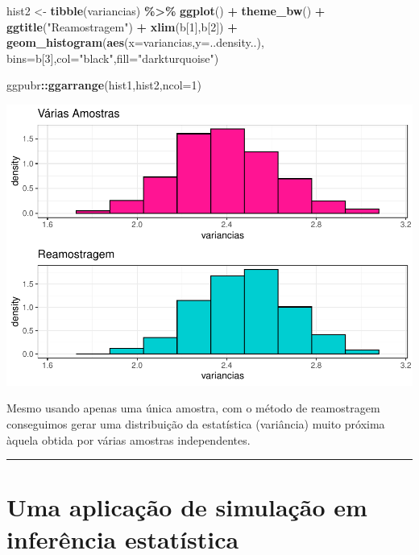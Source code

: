\documentclass[
]{book}
\newenvironment{Shaded}{\begin{snugshade}}{\end{snugshade}}
\newcommand{\AttributeTok}[1]{\textcolor[rgb]{0.13,0.29,0.53}{#1}}
\newcommand{\DecValTok}[1]{\textcolor[rgb]{0.00,0.00,0.81}{#1}}
\newcommand{\FunctionTok}[1]{\textcolor[rgb]{0.13,0.29,0.53}{\textbf{#1}}}
\newcommand{\NormalTok}[1]{#1}
\newcommand{\OtherTok}[1]{\textcolor[rgb]{0.56,0.35,0.01}{#1}}
\newcommand{\SpecialCharTok}[1]{\textcolor[rgb]{0.81,0.36,0.00}{\textbf{#1}}}
\newcommand{\StringTok}[1]{\textcolor[rgb]{0.31,0.60,0.02}{#1}}
\begin{document}
\begin{Shaded}
\begin{Highlighting}[]
\NormalTok{hist2 }\OtherTok{\textless{}{-}} \FunctionTok{tibble}\NormalTok{(variancias) }\SpecialCharTok{\%\textgreater{}\%} \FunctionTok{ggplot}\NormalTok{() }\SpecialCharTok{+} \FunctionTok{theme\_bw}\NormalTok{() }\SpecialCharTok{+} 
  \FunctionTok{ggtitle}\NormalTok{(}\StringTok{"Reamostragem"}\NormalTok{) }\SpecialCharTok{+} \FunctionTok{xlim}\NormalTok{(b[}\DecValTok{1}\NormalTok{],b[}\DecValTok{2}\NormalTok{]) }\SpecialCharTok{+}
  \FunctionTok{geom\_histogram}\NormalTok{(}\FunctionTok{aes}\NormalTok{(}\AttributeTok{x=}\NormalTok{variancias,}\AttributeTok{y=}\NormalTok{..density..),}
      \AttributeTok{bins=}\NormalTok{b[}\DecValTok{3}\NormalTok{],}\AttributeTok{col=}\StringTok{"black"}\NormalTok{,}\AttributeTok{fill=}\StringTok{"darkturquoise"}\NormalTok{)}

\NormalTok{ggpubr}\SpecialCharTok{::}\FunctionTok{ggarrange}\NormalTok{(hist1,hist2,}\AttributeTok{ncol=}\DecValTok{1}\NormalTok{)}
\end{Highlighting}
\end{Shaded}

\begin{center}\includegraphics{AED_files/figure-latex/reamostragem-1} \end{center}

Mesmo usando apenas uma única amostra, com o método de reamostragem conseguimos gerar uma distribuição da estatística (variância) muito próxima àquela obtida por várias amostras independentes.

\begin{center}\rule{0.5\linewidth}{0.5pt}\end{center}

\section{Uma aplicação de simulação em inferência estatística}\label{uma-aplicauxe7uxe3o-de-simulauxe7uxe3o-em-inferuxeancia-estatuxedstica}
\end{document}
